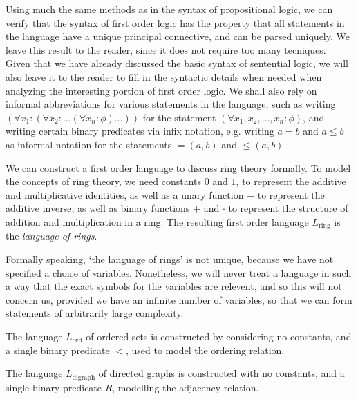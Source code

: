Using much the same methods as in the syntax of propositional logic, we can verify that the syntax of first order logic has the property that all statements in the language have a unique principal connective, and can be parsed uniquely. We leave this result to the reader, since it does not require too many tecniques. Given that we have already discussed the basic syntax of sentential logic, we will also leave it to the reader to fill in the syntactic details when needed when analyzing the interesting portion of first order logic. We shall also rely on informal abbreviations for various statements in the language, such as writing $(\forall x_1 : (\forall x_2: \dots (\forall x_n: \phi)\dots))$ for the statement $(\forall x_1, x_2, \dots, x_n : \phi)$, and writing certain binary predicates via infix notation, e.g. writing $a = b$ and $a \leq b$ as informal notation for the statements $=(a,b)$ and $\leq(a,b)$.

\begin{example}
    We can construct a first order language to discuss ring theory formally. To model the concepts of ring theory, we need constants $0$ and $1$, to represent the additive and multiplicative identities, as well as a unary function $-$ to represent the additive inverse, as well as binary functions $+$ and $\cdot$ to represent the structure of addition and multiplication in a ring. The resulting first order language $L_{\text{ring}}$ is the \emph{language of rings}.
\end{example}

Formally speaking, `the language of rings' is not unique, because we have not specified a choice of variables. Nonetheless, we will never treat a language in such a way that the exact symbols for the variables are relevent, and so this will not concern us, provided we have an infinite number of variables, so that we can form statements of arbitrarily large complexity.

\begin{example}
    The language $L_{\text{ord}}$ of ordered sets is constructed by considering no constants, and a single binary predicate $<$, used to model the ordering relation.
\end{example}

\begin{example}
    The language $L_{\text{digraph}}$ of directed graphs is constructed with no constants, and a single binary predicate $R$, modelling the adjacency relation.
\end{example}

